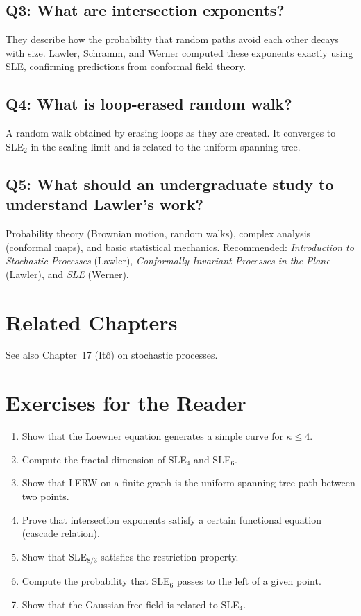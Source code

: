 \subsection*{Q3: What are intersection exponents?}
They describe how the probability that random paths avoid each other decays with size. Lawler, Schramm, and Werner computed these exponents exactly using SLE, confirming predictions from conformal field theory.

\subsection*{Q4: What is loop-erased random walk?}
A random walk obtained by erasing loops as they are created. It converges to SLE$_2$ in the scaling limit and is related to the uniform spanning tree.

\subsection*{Q5: What should an undergraduate study to understand Lawler's work?}
Probability theory (Brownian motion, random walks), complex analysis (conformal maps), and basic statistical mechanics. Recommended: \textit{Introduction to Stochastic Processes} (Lawler), \textit{Conformally Invariant Processes in the Plane} (Lawler), and \textit{SLE} (Werner).

\section{Related Chapters}
See also Chapter~17 (It\^o) on stochastic processes.

\section*{Exercises for the Reader}

\begin{enumerate}
    \item [I] Show that the Loewner equation generates a simple curve for $\kappa \leq 4$.
    \item [B] Compute the fractal dimension of SLE$_4$ and SLE$_6$.
    \item [I] Show that LERW on a finite graph is the uniform spanning tree path between two points.
    \item [A] Prove that intersection exponents satisfy a certain functional equation (cascade relation).
    \item [A] Show that SLE$_{8/3}$ satisfies the restriction property.
    \item [I] Compute the probability that SLE$_6$ passes to the left of a given point.
    \item [A] Show that the Gaussian free field is related to SLE$_4$.
\end{enumerate}

